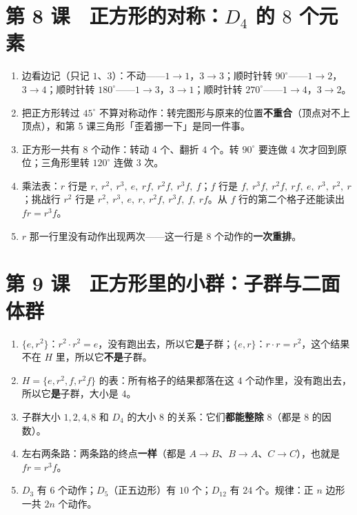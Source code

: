 \section*{第 8 课　正方形的对称：\(D_4\) 的 \(8\) 个元素}
\begin{enumerate}
  \item 边看边记（只记 \(1\)、\(3\)）：不动——\(1\to1\)，\(3\to3\)；顺时针转 \(90^\circ\)——\(1\to2\)，\(3\to4\)；顺时针转 \(180^\circ\)——\(1\to3\)，\(3\to1\)；顺时针转 \(270^\circ\)——\(1\to4\)，\(3\to2\)。
  \item 把正方形转过 \(45^\circ\) 不算对称动作：转完图形与原来的位置\textbf{不重合}（顶点对不上顶点），和第 5 课三角形「歪着挪一下」是同一件事。
  \item 正方形一共有 \(8\) 个动作：转动 \(4\) 个、翻折 \(4\) 个。转 \(90^\circ\) 要连做 \(4\) 次才回到原位；三角形里转 \(120^\circ\) 连做 \(3\) 次。
  \item 乘法表：\(r\) 行是 \(r,\ r^2,\ r^3,\ e,\ rf,\ r^2f,\ r^3f,\ f\)；\(f\) 行是 \(f,\ r^3f,\ r^2f,\ rf,\ e,\ r^3,\ r^2,\ r\)；挑战行 \(r^2\) 行是 \(r^2,\ r^3,\ e,\ r,\ r^2f,\ r^3f,\ f,\ rf\)。从 \(f\) 行的第二个格子还能读出 \(fr=r^3f\)。
  \item \(r\) 那一行里没有动作出现两次——这一行是 \(8\) 个动作的\textbf{一次重排}。
\end{enumerate}

\section*{第 9 课　正方形里的小群：子群与二面体群}
\begin{enumerate}
  \item \(\{e,r^2\}\)：\(r^2\cdot r^2=e\)，没有跑出去，所以它\textbf{是}子群；\(\{e,r\}\)：\(r\cdot r=r^2\)，这个结果不在 \(H\) 里，所以它\textbf{不是}子群。
  \item \(H=\{e,r^2,f,r^2f\}\) 的表：所有格子的结果都落在这 \(4\) 个动作里，没有跑出去，所以它\textbf{是}子群，大小是 \(4\)。
  \item 子群大小 \(1,2,4,8\) 和 \(D_4\) 的大小 \(8\) 的关系：它们\textbf{都能整除} \(8\)（都是 \(8\) 的因数）。
  \item 左右两条路：两条路的终点\textbf{一样}（都是 \(A\to B\)、\(B\to A\)、\(C\to C\)），也就是 \(fr=r^3f\)。
  \item \(D_3\) 有 \(6\) 个动作；\(D_5\)（正五边形）有 \(10\) 个；\(D_{12}\) 有 \(24\) 个。规律：正 \(n\) 边形一共 \(2n\) 个动作。
\end{enumerate}

